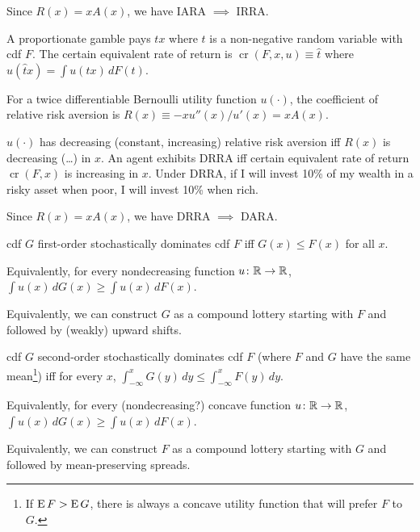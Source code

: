 \documentclass[8pt,letterpaper, landscape]{extarticle} %
\begin{document}
\begin{multicols}{3}
\begin{description}
Since $ R(x) = x A(x) $, we have IARA $ \implies $ IRRA.

 A proportionate gamble pays $ tx $ where $ t $ is a non-negative random variable with cdf $ F $. The certain equivalent rate of return is $ \operatorname{cr} (F, x, u) \equiv \hat{t} $ where $ u(\hat{t}x) = \int u(tx) \, dF(t) $.

 For a twice differentiable Bernoulli utility function $ u(\cdot) $, the coefficient of relative risk aversion is $ R(x) \equiv - x u''(x) / u'(x) = x A(x) $.

$ u(\cdot) $ has decreasing (constant, increasing) relative risk aversion iff $ R(x) $ is decreasing (\ldots) in $ x $. An agent exhibits DRRA iff certain equivalent rate of return $ \operatorname{cr} (F, x) $ is increasing in $ x $. Under DRRA, if I will invest 10\% of my wealth in a risky asset when poor, I will invest 10\% when rich.

Since $ R(x) = x A(x) $, we have DRRA $ \implies $ DARA.

 cdf $ G $ first-order stochastically dominates cdf $ F $ iff $ G(x) \leq F(x) $ for all $ x $.

Equivalently, for every nondecreasing function $ u \colon \mathbb{R} \to \mathbb{R} $, $ \int u(x) \, dG(x) \geq \int u(x) \, dF(x) $.

Equivalently, we can construct $ G $ as a compound lottery starting with $ F $ and followed by (weakly) upward shifts.

 cdf $ G $ second-order stochastically dominates cdf $ F $ (where $ F $ and $ G $ have the same mean\footnote{If $ \operatorname{E} F > \operatorname{E} G $, there is always a concave utility function that will prefer $ F $ to $ G $.}) iff for every $ x $, $ \int_{-\infty}^{x} G(y) \, dy \leq \int_{-\infty}^{x} F(y) \, dy $.

Equivalently, for every (nondecreasing?) concave function $ u \colon \mathbb{R} \to \mathbb{R} $, $ \int u(x) \, dG(x) \geq \int u(x) \, dF(x) $.

Equivalently, we can construct $ F $ as a compound lottery starting with $ G $ and followed by mean-preserving spreads.


\end{description}
\end{multicols}
\end{document}
